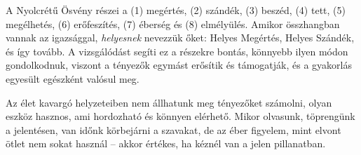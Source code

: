 A Nyolcrétű Ösvény részei a (1) megértés, (2) szándék, (3) beszéd, (4)
tett, (5) megélhetés, (6) erőfeszítés, (7) éberség és (8) elmélyülés.
Amikor összhangban vannak az igazsággal, \emph{helyesnek} nevezzük őket:
Helyes Megértés, Helyes Szándék, és így tovább. A vizsgálódást segíti ez
a részekre bontás, könnyebb ilyen módon gondolkodnuk, viszont a tényezők
egymást erősítik és támogatják, és a gyakorlás egyesült egészként
valósul meg.

Az élet kavargó helyzeteiben nem állhatunk meg tényezőket számolni,
olyan eszköz hasznos, ami hordozható és könnyen elérhető. Mikor
olvasunk, töprengünk a jelentésen, van időnk körbejárni a szavakat, de
az éber figyelem, mint elvont ötlet nem sokat használ -- akkor értékes,
ha kéznél van a jelen pillanatban.
